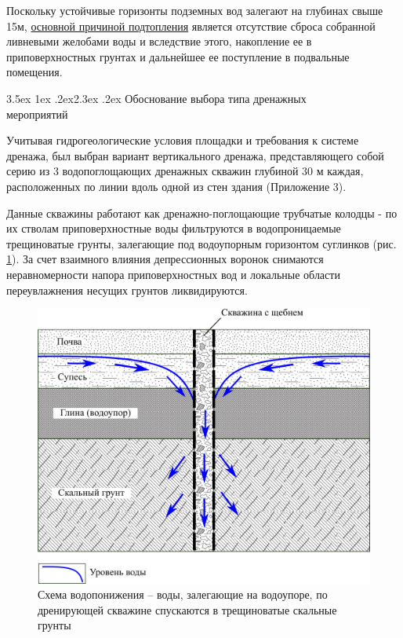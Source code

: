 \documentclass[a4paper,12pt]{article} %
\makeatletter
\renewcommand\section{\@startsection {section}{1}{\parindent}%
	{3.5ex \@plus 1ex \@minus .2ex}{2.3ex \@plus.2ex}%
	{\normalfont\hyphenpenalty=10000\Large\bfseries}}
\makeatother
\begin{document}
Поскольку устойчивые горизонты подземных вод залегают на глубинах свыше 15\-м, \underline{основной причиной подтопления} является отсутствие сброса собранной ливневыми желобами воды и вследствие этого, накопление ее в приповерхностных грунтах и дальнейшее ее поступление в подвальные помещения.

\section{Обоснование выбора типа дренажных \\ мероприятий}

Учитывая гидрогеологические условия площадки и требования к системе дренажа, был выбран вариант вертикального дренажа, представляющего собой серию из 3 водопоглощающих дренажных скважин глубиной 30 м каждая, расположенных по линии вдоль одной из стен здания (Приложение 3). 

Данные скважины работают как дренажно-поглощающие трубчатые колодцы - по их стволам приповерхностные воды фильтруются в водопроницаемые трещиноватые грунты, залегающие под  водоупорным горизонтом суглинков (рис. \ref{img:scheme1}). За счет взаимного влияния депрессионных воронок снимаются неравномерности напора приповерхностных вод и локальные области переувлажнения несущих грунтов ликвидируются.

\begin{figure}[!h]
	\centering
	\includegraphics{img1.png}
	\caption[Схема водопонижения]{Схема водопонижения – воды, залегающие на водоупоре, по дренирующей скважине спускаются в трещиноватые скальные грунты}
	\label{img:scheme1}
\end{figure}
\end{document}
